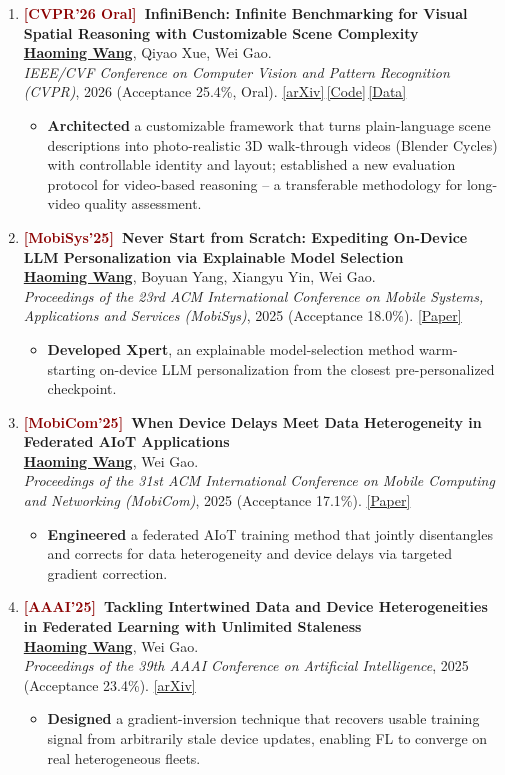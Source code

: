 \documentclass[11pt, letterpaper]{article}
\newenvironment{publist}{
  \begin{enumerate}[leftmargin=1.7em, itemsep=4pt, parsep=0pt, topsep=2pt, label=\arabic*.]
}{\end{enumerate}}
\newcommand{\impactbullet}[1]{%
  \par\vspace{1pt}%
  \begin{itemize}[leftmargin=1.2em, topsep=0pt, itemsep=0pt, parsep=0pt, partopsep=0pt]
    \item #1
  \end{itemize}}
\newcommand{\me}{\underline{\textbf{Haoming Wang}}}
\begin{document}
\begin{publist}
\item \textbf{\textcolor{darkred}{[CVPR'26 Oral]}\ InfiniBench: Infinite Benchmarking for Visual Spatial Reasoning with Customizable Scene Complexity}\\
\me, Qiyao Xue, Wei Gao.\\
\textit{IEEE/CVF Conference on Computer Vision and Pattern Recognition (CVPR)}, 2026 (Acceptance 25.4\%, Oral). \href{https://arxiv.org/abs/2511.18200}{[arXiv]}\,\href{https://github.com/pittisl/infinibench}{[Code]}\,\href{https://huggingface.co/datasets/Haoming645/infinibench}{[Data]}
\impactbullet{\textbf{Architected} a customizable framework that turns plain-language scene descriptions into photo-realistic 3D walk-through videos (Blender Cycles) with controllable identity and layout; established a new evaluation protocol for video-based reasoning -- a transferable methodology for long-video quality assessment.}

\item \textbf{\textcolor{darkred}{[MobiSys'25]}\ Never Start from Scratch: Expediting On-Device LLM Personalization via Explainable Model Selection}\\
\me, Boyuan Yang, Xiangyu Yin, Wei Gao.\\
\textit{Proceedings of the 23rd ACM International Conference on Mobile Systems, Applications and Services (MobiSys)}, 2025 (Acceptance 18.0\%). \href{https://haomingwang645.github.io/pdfs/xpert_paper.pdf}{[Paper]}
\impactbullet{\textbf{Developed Xpert}, an explainable model-selection method warm-starting on-device LLM personalization from the closest pre-personalized checkpoint.}

\item \textbf{\textcolor{darkred}{[MobiCom'25]}\ When Device Delays Meet Data Heterogeneity in Federated AIoT Applications}\\
\me, Wei Gao.\\
\textit{Proceedings of the 31st ACM International Conference on Mobile Computing and Networking (MobiCom)}, 2025 (Acceptance 17.1\%). \href{https://haomingwang645.github.io/pdfs/feddc_paper.pdf}{[Paper]}
\impactbullet{\textbf{Engineered} a federated AIoT training method that jointly disentangles and corrects for data heterogeneity and device delays via targeted gradient correction.}

\item \textbf{\textcolor{darkred}{[AAAI'25]}\ Tackling Intertwined Data and Device Heterogeneities in Federated Learning with Unlimited Staleness}\\
\me, Wei Gao.\\
\textit{Proceedings of the 39th AAAI Conference on Artificial Intelligence}, 2025 (Acceptance 23.4\%). \href{https://arxiv.org/abs/2309.13536}{[arXiv]}
\impactbullet{\textbf{Designed} a gradient-inversion technique that recovers usable training signal from arbitrarily stale device updates, enabling FL to converge on real heterogeneous fleets.}
\end{publist}
\end{document}
